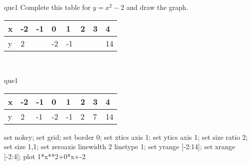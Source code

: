 \documentclass[13.5pt, varwidth=true]{beamer}
\begin{document}
\begin{frame}[shrink=19,fragile]
	\begin{beamercolorbox}[rounded=true, left, shadow=true,wd=14.8cm]{que1}
		 Complete this table for $y = x^{2} - 2$ and draw the graph. \\[0.3cm] \renewcommand{\arraystretch}{1.2}\begin{tabular}{|C|C|C|C|C|C|C|C|} \hline x & -2 & -1 & 0 & 1 & 2 & 3 & 4 \\ \hline y & 2 &  & -2 & -1 &  &  & 14\\ \hline \end{tabular}\\[0.3cm]
	\end{beamercolorbox}
\end{frame}
\begin{frame}[shrink=19,fragile]
	\begin{beamercolorbox}[rounded=true, left, shadow=true,wd=14.8cm]{que1}
		\renewcommand{\arraystretch}{1.2}\begin{tabular}{|C|C|C|C|C|C|C|C|} \hline x & -2 & -1 & 0 & 1 & 2 & 3 & 4 \\ \hline y & 2 & -1 & -2 & -1 & 2 & 7 & 14\\ \hline \end{tabular}\begin{gnuplot}[terminal=pdf] set nokey; set grid; set border 0; set xtics axis 1; set ytics axis 1; set size ratio 2; set size 1,1; set zeroaxis linewidth 2 linetype 1; set yrange [-2:14]; set xrange [-2:4]; plot 1*x**2+0*x+-2 \end{gnuplot}
	\end{beamercolorbox}
\end{frame}
\end{document}
